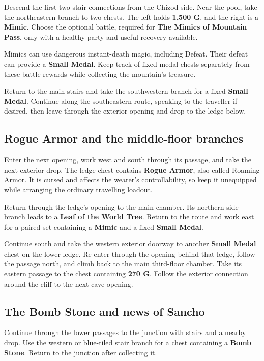 Descend the first two stair connections from the Chizod side.
Near the pool, take the northeastern branch to two chests. The left
holds \textbf{1,500 G}, and the right is a \textbf{Mimic}.
Choose the optional battle, required for \textbf{The Mimics of Mountain
Pass}, only with a healthy party and useful
recovery available.

Mimics can use dangerous instant-death magic, including Defeat.
Their defeat can provide a \textbf{Small Medal}. Keep track of
fixed medal chests separately from these battle rewards while
collecting the mountain's treasure.

Return to the main stairs and take the southwestern branch for a
fixed \textbf{Small Medal}. Continue along the southeastern route,
speaking to the traveller if desired, then leave through the exterior
opening and drop to the ledge below.

\subsection*{Rogue Armor and the middle-floor branches}

Enter the next opening, work west and south through its passage,
and take the next exterior drop. The ledge chest contains
\textbf{Rogue Armor}, also called Roaming Armor. It is cursed
and affects the wearer's controllability, so keep it unequipped
while arranging the ordinary travelling loadout.

Return through the ledge's opening to the main chamber. Its northern
side branch leads
to a \textbf{Leaf of the World Tree}. Return to the route and work
east for a paired set containing a \textbf{Mimic} and a fixed
\textbf{Small Medal}.

Continue south and take the western exterior doorway to another
\textbf{Small Medal} chest on the lower ledge. Re-enter through
the opening behind that ledge, follow the passage north, and climb
back to the main third-floor chamber. Take its eastern passage to
the chest containing \textbf{270 G}.
Follow the exterior connection around the cliff to the next cave opening.

\subsection*{The Bomb Stone and news of Sancho}

Continue through the lower passages to the junction with stairs and
a nearby drop. Use the western or blue-tiled stair branch for a
chest containing a \textbf{Bomb Stone}. Return to the junction
after collecting it.

